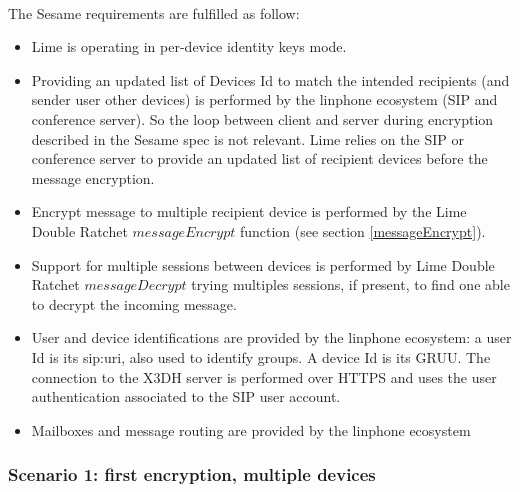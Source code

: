 \documentclass[a4paper,11pt]{article}
\begin{document}
    \paragraph{}The Sesame requirements are fulfilled as follow:
    \begin{itemize}
      \item Lime is operating in per-device identity keys mode.
      \item Providing an updated list of Devices Id to match the intended recipients (and sender user other devices) is performed by the linphone ecosystem (SIP and conference server). So the loop between client and server during encryption described in the Sesame spec\cite{sesame} is not relevant. Lime relies on the SIP or conference server to provide an updated list of recipient devices before the message encryption.
      \item Encrypt message to multiple recipient device is performed by the Lime Double Ratchet $messageEncrypt$ function (see section \ref{messageEncrypt}).
      \item Support for multiple sessions between devices is performed by Lime Double Ratchet $messageDecrypt$ trying multiples sessions, if present, to find one able to decrypt the incoming message.
      \item User and device identifications are provided by the linphone ecosystem: a user Id is its sip:uri, also used to identify groups. A device Id is its GRUU\cite{rfc5627}. The connection to the X3DH server is performed over HTTPS and uses the user authentication associated to the SIP user account.
      \item Mailboxes and message routing are provided by the linphone ecosystem
    \end{itemize}

    \newpage
    \subsubsection{Scenario 1: first encryption, multiple devices}
\end{document}
